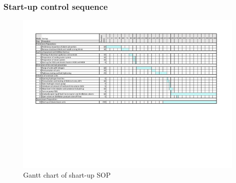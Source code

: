 \subsubsection{Start-up control sequence}
\begin{figure}[h]
    \centering
    \includegraphics[clip, trim= 1cm 8cm 1cm 1.5cm, width=\linewidth]{chapters/4-operation-control/4-Figures/Shart-up.pdf}
    \caption{Gantt chart of shart-up SOP}
    \label{fig:startup}
\end{figure}



